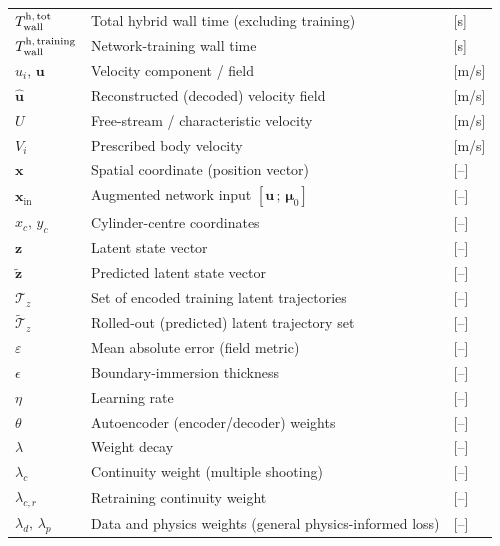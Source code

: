 \begin{longtable}{p{2.5cm}p{9cm}p{2.5cm}}
    $T_\text{wall}^\text{h,\,tot}$ & Total hybrid wall time (excluding training) & [s] \\
    $T_\text{wall}^\text{h,\,training}$ & Network-training wall time         & [s] \\
    $u_i,\,\mathbf{u}$   & Velocity component / field                       & [m/s] \\
    $\hat{\mathbf{u}}$   & Reconstructed (decoded) velocity field           & [m/s] \\
    $U$                  & Free-stream / characteristic velocity            & [m/s] \\
    $V_i$                & Prescribed body velocity                         & [m/s] \\
    $\mathbf{x}$         & Spatial coordinate (position vector)             & [--] \\
    $\mathbf{x}_\text{in}$ & Augmented network input $[\mathbf{u}\,;\,\boldsymbol{\mu}_0]$ & [--] \\
    $x_c,\,y_c$          & Cylinder-centre coordinates                      & [--] \\
    $\mathbf{z}$         & Latent state vector                              & [--] \\
    $\tilde{\mathbf{z}}$ & Predicted latent state vector                    & [--] \\
    $\boldsymbol{\mathcal{T}}_z$ & Set of encoded training latent trajectories & [--] \\
    $\tilde{\boldsymbol{\mathcal{T}}}_z$ & Rolled-out (predicted) latent trajectory set & [--] \\
    \midrule %
    $\varepsilon$        & Mean absolute error (field metric)               & [--] \\
    $\epsilon$           & Boundary-immersion thickness                     & [--] \\
    $\eta$               & Learning rate                                    & [--] \\
    $\theta$             & Autoencoder (encoder/decoder) weights            & [--] \\
    $\lambda$            & Weight decay                                     & [--] \\
    $\lambda_c$          & Continuity weight (multiple shooting)            & [--] \\
    $\lambda_{c,r}$      & Retraining continuity weight                     & [--] \\
    $\lambda_d,\,\lambda_p$ & Data and physics weights (general physics-informed loss) & [--] \\

\end{longtable}

